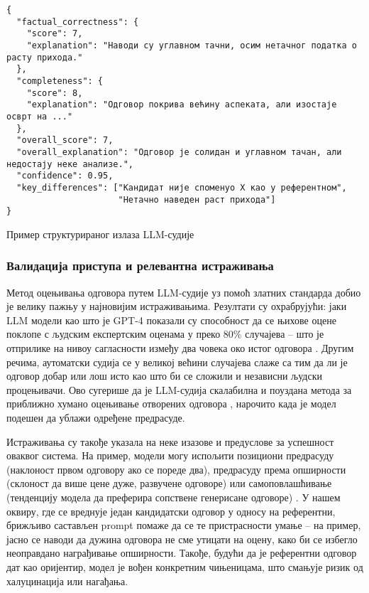 \begin{listing}[!ht]
\begin{verbatim}
{
  "factual_correctness": {
    "score": 7, 
    "explanation": "Наводи су углавном тачни, осим нетачног податка о расту прихода."
  },
  "completeness": {
    "score": 8, 
    "explanation": "Одговор покрива већину аспеката, али изостаје осврт на ..."
  },
  "overall_score": 7,
  "overall_explanation": "Одговор је солидан и углавном тачан, али недостају неке анализе.",
  "confidence": 0.95,
  "key_differences": ["Кандидат није споменуо X као у референтном", 
                      "Нетачно наведен раст прихода"]
}
\end{verbatim}
\caption{Пример структурираног излаза LLM-судије}\label{lst:llm_judge_output}
\end{listing}

\subsubsection{Валидација приступа и релевантна истраживања}

Метод оцењивања одговора путем LLM-судије уз помоћ златних стандарда добио је велику пажњу у најновијим истраживањима. Резултати су охрабрујући: јаки LLM модели као што је GPT-4 показали су способност да се њихове оцене поклопе с људским експертским оценама у преко 80\% случајева -- што је отприлике на нивоу сагласности између два човека око истог одговора \cite{zheng_judging_llm_2023,evidently_ai_llm_judge_2025}. Другим речима, аутоматски судија се у великој већини случајева слаже са тим да ли је одговор добар или лош исто као што би се сложили и независни људски процењивачи. Ово сугерише да је LLM-судија скалабилна и поуздана метода за приближно хумано оцењивање отворених одговора \cite{evidently_ai_llm_judge_2025}, нарочито када је модел подешен да ублажи одређене предрасуде.

Истраживања су такође указала на неке изазове и предуслове за успешност оваквог система. На пример, модели могу испољити позициони предрасуду (наклоност првом одговору ако се пореде два), предрасуду према опширности (склоност да више цене дуже, развучене одговоре) или самоповлашћивање (тенденцију модела да преферира сопствене генерисане одговоре) \cite{zheng_judging_llm_2023,verga_replacing_judges_2024}. У нашем оквиру, где се вреднује један кандидатски одговор у односу на референтни, брижљиво састављен prompt помаже да се те пристрасности умање -- на пример, јасно се наводи да дужина одговора не сме утицати на оцену, како би се избегло неоправдано награђивање опширности. Такође, будући да је референтни одговор дат као оријентир, модел је вођен конкретним чињеницама, што смањује ризик од халуцинација или нагађања.

